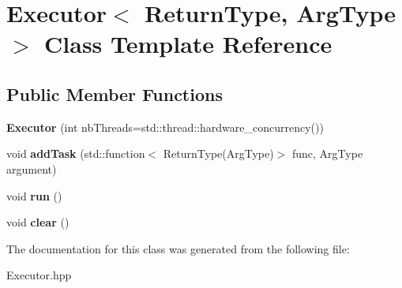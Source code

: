 \hypertarget{classExecutor}{}\section{Executor$<$ Return\+Type, Arg\+Type $>$ Class Template Reference}
\label{classExecutor}
\subsection*{Public Member Functions}
\begin{DoxyCompactItemize}
\item 
\mbox{\label{classExecutor_a783d0d5754142c9e56e0c0a4145d44ce}} 
{\bfseries Executor} (int nb\+Threads=std\+::thread\+::hardware\+\_\+concurrency())
\item 
\mbox{\label{classExecutor_a04ca3995fd6dccf42d235d9695ec0903}} 
void {\bfseries add\+Task} (std\+::function$<$ Return\+Type(Arg\+Type)$>$ func, Arg\+Type argument)
\item 
\mbox{\label{classExecutor_a5905222a566b53ea585f83ea8fd1e565}} 
void {\bfseries run} ()
\item 
\mbox{\label{classExecutor_a3e13df6ead70066b3b26c3e83233e9e6}} 
void {\bfseries clear} ()
\end{DoxyCompactItemize}


The documentation for this class was generated from the following file\+:\begin{DoxyCompactItemize}
\item 
Executor.\+hpp\end{DoxyCompactItemize}
